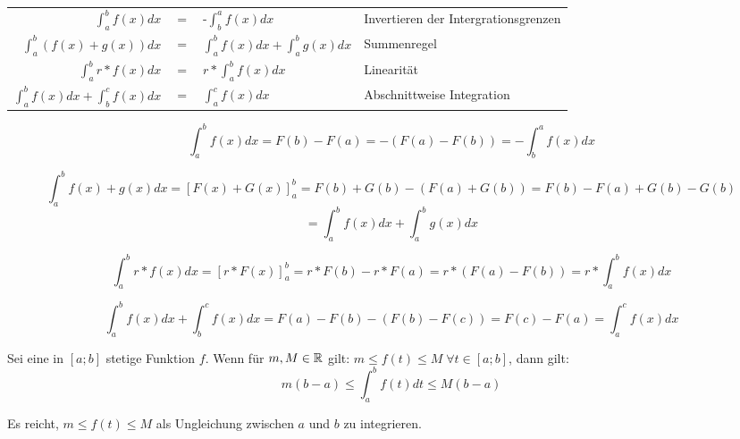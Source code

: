 \documentclass[main.tex]{subfiles}
\begin{document}
\begin{Theorem}
  \begin{center}
    \begin{tabular}{r c l l}
      \( \displaystyle\int_a^b f(x)dx\) & $=$ &  -\( \displaystyle\int_b^a f(x)dx\) & Invertieren der Intergrationsgrenzen \\
      \( \displaystyle\int_a^b (f(x)+g(x))dx \) & $=$ &  \( \displaystyle\int_a^b f(x)dx + \int_a^b g(x)dx\) & Summenregel\\
      \( \displaystyle\int_a^b r*f(x)dx\)  & $=$ &  \( \displaystyle r*\int_a^b f(x)dx\) & Linearität\\
      \( \displaystyle\int_a^b f(x)dx +\int_b^c f(x)dx\)  & $=$ &  \( \displaystyle\int_a^c f(x)dx\) & Abschnittweise Integration
    \end{tabular}
  \end{center}
\end{Theorem}

\begin{Beweis}
  $$\int_a^b f(x)dx = F(b)-F(a) = -(F(a)-F(b)) = -\int_b^a f(x)dx$$
\end{Beweis}

\begin{Beweis}[Summenregel]
  $$\int_a^b f(x)+g(x)dx = [F(x)+G(x)]_a^b = F(b)+G(b)-(F(a)+G(b)) = F(b)-F(a)+G(b)-G(b) $$$$= \int_a^b f(x)dx+\int_a^b g(x)dx$$
\end{Beweis}

\begin{Beweis}[Linearität]
  $$\int_a^b r*f(x)dx = [r*F(x)]_a^b = r*F(b)-r*F(a) = r*(F(a)-F(b)) = r*\int_a^b f(x)dx$$
\end{Beweis}

\begin{Beweis}
  $$\int_a^b f(x)dx+ \int_b^c f(x)dx = F(a)-F(b)-(F(b)-F(c)) = F(c)-F(a) = \int_a^c f(x)dx$$
\end{Beweis}

\begin{Theorem}
  Sei eine in $[a;b]$ stetige Funktion $f$. Wenn für $m,M \in \mathbb{R}$ gilt: $m\leq f(t) \leq M \; \forall t \in [a;b]$, dann gilt:
  $$m(b-a) \leq \int_a^b f(t)dt \leq M(b-a)$$
\end{Theorem}

\begin{Beweis}
  Es reicht, $m \leq f(t) \leq M$ als Ungleichung zwischen $a$ und $b$ zu integrieren.
\end{Beweis}
\end{document}
